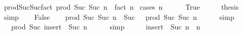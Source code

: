\begin{isabellebody}
{\isafoldproof}%
%
\isadelimproof
\isanewline
%
\endisadelimproof
\isanewline
{}\isamarkupfalse%
\ prod{\isacharunderscore}{\kern0pt}Suc{\isacharunderscore}{\kern0pt}Suc{\isacharunderscore}{\kern0pt}fact{\isacharcolon}{\kern0pt}\ {\isachardoublequoteopen}prod\ Suc\ {\isacharbraceleft}{\kern0pt}Suc\ {}{\isachardot}{\kern0pt}{\isachardot}{\kern0pt}{\isacharless}{\kern0pt}n{\isacharbraceright}{\kern0pt}\ {\isacharequal}{\kern0pt}\ fact\ n{\isachardoublequoteclose}\isanewline
%
\isadelimproof
%
\endisadelimproof
%
\isatagproof
{}\isamarkupfalse%
\ {\isacharparenleft}{\kern0pt}cases\ {\isachardoublequoteopen}n\ {\isacharequal}{\kern0pt}\ {}{\isachardoublequoteclose}{\isacharparenright}{\kern0pt}\isanewline
\ \ \isamarkupfalse%
\ True\isanewline
\ \ \isamarkupfalse%
\ \isamarkupfalse%
\ {\isacharquery}{\kern0pt}thesis\ \isamarkupfalse%
\ simp\isanewline
{}\isamarkupfalse%
\isanewline
\ \ \isamarkupfalse%
\ False\isanewline
\ \ \isamarkupfalse%
\ {\isachardoublequoteopen}prod\ Suc\ {\isacharbraceleft}{\kern0pt}Suc\ {}{\isachardot}{\kern0pt}{\isachardot}{\kern0pt}{\isacharless}{\kern0pt}n{\isacharbraceright}{\kern0pt}\ {\isacharequal}{\kern0pt}\ Suc\ {}\ {\isacharasterisk}{\kern0pt}\ prod\ Suc\ {\isacharbraceleft}{\kern0pt}Suc\ {}{\isachardot}{\kern0pt}{\isachardot}{\kern0pt}{\isacharless}{\kern0pt}n{\isacharbraceright}{\kern0pt}{\isachardoublequoteclose}\isanewline
\ \ \ \ \isamarkupfalse%
\ simp\isanewline
\ \ \isamarkupfalse%
\ \isamarkupfalse%
\ {\isachardoublequoteopen}{\isasymdots}\ {\isacharequal}{\kern0pt}\ prod\ Suc\ {\isacharparenleft}{\kern0pt}insert\ {}\ {\isacharbraceleft}{\kern0pt}Suc\ {}{\isachardot}{\kern0pt}{\isachardot}{\kern0pt}{\isacharless}{\kern0pt}n{\isacharbraceright}{\kern0pt}{\isacharparenright}{\kern0pt}{\isachardoublequoteclose}\isanewline
\ \ \ \ \isamarkupfalse%
\ simp\isanewline
\ \ \isamarkupfalse%
\ \isamarkupfalse%
\ {\isachardoublequoteopen}insert\ {}\ {\isacharbraceleft}{\kern0pt}Suc\ {}{\isachardot}{\kern0pt}{\isachardot}{\kern0pt}{\isacharless}{\kern0pt}n{\isacharbraceright}{\kern0pt}\ {\isacharequal}{\kern0pt}\ {\isacharbraceleft}{\kern0pt}{}{\isachardot}{\kern0pt}{\isachardot}{\kern0pt}{\isacharless}{\kern0pt}n{\isacharbraceright}{\kern0pt}{\isachardoublequoteclose}\isanewline

\end{isabellebody}
